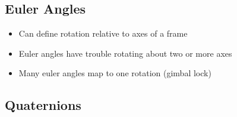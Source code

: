 \documentclass[../main.tex]{subfiles}
\begin{document}
  \subsection{Euler Angles}
  \begin{itemize}
    \item Can define rotation relative to axes of a frame
    \item Euler angles have trouble rotating about two or more axes
    \item Many euler angles map to one rotation (gimbal lock)
  \end{itemize}

  \subsection{Quaternions}
\end{document}

